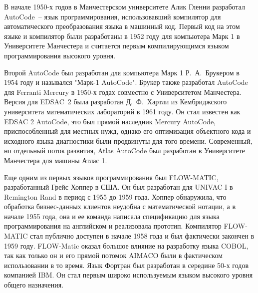 В начале 1950-х годов в Манчестерском университете Алик Гленни разработал
AutoCode~-- язык программирования, использовавший компилятор для
автоматического преобразования языка в машинный код. Первый код на этом языке и
компилятор были разработаны в 1952 году для компьютера Марк 1 в Университете
Манчестера и считается первым компилирующимся языком программирования высокого
уровня.

Второй AutoCode был разработан для компьютера Марк 1 Р.~А.~Брукером в 1954 году
и назывался "Марк-1 AutoCode". Брукер также разработал AutoCode для Ferranti
Mercury в 1950-х годах совместно с Университетом Манчестера. Версия для EDSAC~2
была разработан Д.~Ф.~Хартли из Кембриджского университета математических
лабораторий в 1961 году. Он стал известен как EDSAC 2 AutoCode, это был прямой
наследник Mercury AutoCode, приспособленный для местных нужд, однако его
оптимизация объектного кода и исходного языка диагностики были продвинуты для
того времени. Современный, но отдельный поток развития, Atlas AutoCode был
разработан в Университете Манчестера для машины Атлас 1.

Еще одним из первых языков программирования был FLOW-MATIC, разработанный
Грейс Хоппер в США. Он был разработан для UNIVAC I в Reming\-ton Rand в период
с 1955 до 1959 года. Хоппер обнаружила, что обработка бизнес-данных клиентов
неудобна с математической нотации, а в начале 1955 года, она и ее команда
написала спецификацию для языка программирования на английском и реализовала
прототип. Компилятор FLOW-MATIC стал публично доступен в начале 1958 года и
был фактически закончен в 1959 году. FLOW-Matic оказал большое влияние на
разработку языка COBOL, так как только он и его прямой потомок AIMACO были в
фактическом использовании в то время. Язык Фортран был разработан в середине
50-х годов компанией IBM. Он стал первым широко используемым языком высокого
уровня общего назначения.

